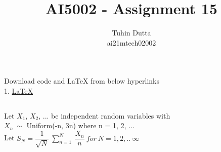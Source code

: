 \documentclass[journal,12pt,twocolumn]{IEEEtran}
\begin{document}
\providecommand{\mtx}[1]{\mathbf{#1}}
\providecommand{\fourier}{\overset{\mathcal{F}}{ \rightleftharpoons}}
\providecommand{\system}{\overset{\mathcal{H}}{ \longleftrightarrow}}
\newcommand{\solution}{\noindent \textbf{Solution: }}
\newcommand{\cosec}{\,\text{cosec}\,}
\providecommand{\dec}[2]{\ensuremath{\overset{#1}{\underset{#2}{\gtrless}}}}
\newcommand{\myvec}[1]{\ensuremath{\begin{pmatrix}#1\end{pmatrix}}}
\newcommand{\mydet}[1]{\ensuremath{\begin{vmatrix}#1\end{vmatrix}}}
\makeatletter
{}
\makeatother
\let\StandardTheFigure\thefigure
\let\vec\mathbf
\renewcommand{\thefigure}{\theproblem}
\def\putbox#1#2#3{\makebox[0in][l]{\makebox[#1][l]{}\raisebox{\baselineskip}[0in][0in]{\raisebox{#2}[0in][0in]{#3}}}}
     \def\rightbox#1{\makebox[0in][r]{#1}}
     \def\centbox#1{\makebox[0in]{#1}}
     \def\topbox#1{\raisebox{-\baselineskip}[0in][0in]{#1}}
     \def\midbox#1{\raisebox{-0.5\baselineskip}[0in][0in]{#1}}
\vspace{3cm}
\title{AI5002 - Assignment 15}
\author{Tuhin Dutta\\ ai21mtech02002}
\maketitle
\newpage
\bigskip
\renewcommand{\thefigure}{\theenumi}
\renewcommand{\thetable}{\theenumi}
\begin{mdframed}
Download code and LaTeX from below hyperlinks\\
1. \href{https://github.com/Tauhait/AI5002/tree/main/Assignment-15/LaTeX}{LaTeX}
\end{mdframed}
\subsection*{}
Let $X_1$, $X_2$, ... be independent random variables with\\ $X_n\ \sim$ Uniform(-n, 3n) where n = 1, 2, ...\\

Let $S_N = \dfrac{1}{\sqrt{N}}\ \sum_{n=1}^{N}\ \dfrac{X_n}{n}\ for\ N = 1, 2, ..\ \infty$\\
\end{document}
